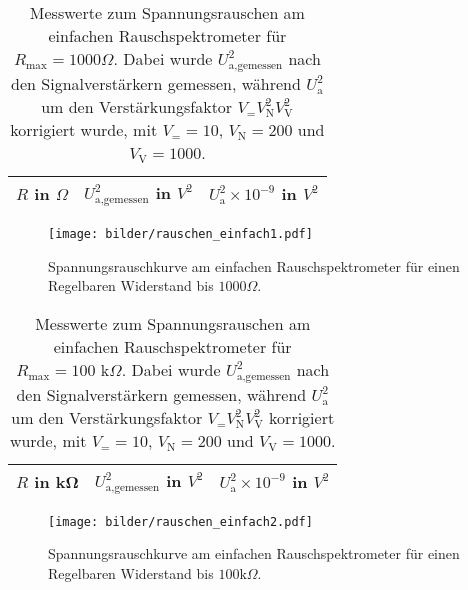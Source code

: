 \begin{table}[h]
			\centering
			\begin{tabular}{ccc}
				\toprule \midrule
				$R$ in $\Omega$ & $U_\text{a,gemessen}^2$ in $V^2$
				& $U_\text{a}^2 \times 10^{-9}$ in $V^2$ \\
				\midrule
				
				\midrule \bottomrule
			\end{tabular}
			\caption{Messwerte zum Spannungsrauschen am einfachen
			Rauschspektrometer für $R_\text{max}=1000 \Omega$.
			Dabei wurde $U_\text{a,gemessen}^2$ nach den Signalverstärkern gemessen, während
			$U_\text{a}^2$ um den Verstärkungsfaktor $V_= V_\text{N}^2 V_\text{V}^2$ korrigiert
			wurde, mit $V_=
			=10$, $V_\text{N}=200$ und $V_\text{V}=1000$.}
			\label{tab:rauschen_einfach1}
\end{table}
\begin{figure}[h]
			\centering
			\texttt{[image: bilder/rauschen\_einfach1.pdf]}
			\caption{Spannungsrauschkurve am einfachen Rauschspektrometer für einen
			Regelbaren Widerstand bis $1000\Omega$.}
			\label{fig:rauschen_einfach1}
	\end{figure}




	\begin{table}[h]
			\centering
			\begin{tabular}{ccc}
				\toprule \midrule
				$R$ in \si{\kilo\ohm} & $U_\text{a,gemessen}^2$ in $V^2$
				& $U_\text{a}^2 \times 10^{-9}$ in $V^2$\\
				\midrule
				
				\midrule \bottomrule
			\end{tabular}
			\caption{Messwerte zum Spannungsrauschen am einfachen
			Rauschspektrometer für $R_\text{max}=100 \text{ k}\Omega$.
			Dabei wurde $U_\text{a,gemessen}^2$ nach den Signalverstärkern gemessen, während
			$U_\text{a}^2$ um den Verstärkungsfaktor $V_= V_\text{N}^2 V_\text{V}^2$ korrigiert
			wurde, mit $V_=
			=10$, $V_\text{N}=200$ und $V_\text{V}=1000$.}
			\label{tab:rauschen_einfach2}
	\end{table}
	\begin{figure}[h]
			\centering
			\texttt{[image: bilder/rauschen\_einfach2.pdf]}
			\caption{Spannungsrauschkurve am einfachen Rauschspektrometer für einen
			Regelbaren Widerstand bis $100\text{k}\Omega$.}
			\label{fig:rauschen_einfach2}

	\end{figure}


